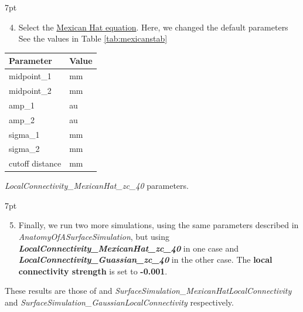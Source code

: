 \documentclass{tufte-handout}
\newenvironment{formal}{%
  \def\FrameCommand{%
    \hspace{1pt}%
    {\color{DarkBlue}\vrule width 2pt}%
    {\color{formalshade}\vrule width 4pt}%
    \colorbox{formalshade}%
  }%
  \MakeFramed{\advance\hsize-\width\FrameRestore}%
  \noindent\hspace{-4.55pt}%
  \begin{adjustwidth}{}{7pt}%
  \vspace{2pt}\vspace{2pt}%
}
{%
  \vspace{2pt}\end{adjustwidth}\endMakeFramed%
}
\newenvironment{simulation}{%
  \def\FrameCommand{%
    \hspace{1pt}%
    {\color{ForestGreen}\vrule width 2pt}%
    {\color{simulationshade}\vrule width 4pt}%
    \colorbox{simulationshade}%
  }%
  \MakeFramed{\advance\hsize-\width\FrameRestore}%
  \noindent\hspace{-4.55pt}%
  \begin{adjustwidth}{}{7pt}%
  \vspace{2pt}\vspace{2pt}%
}
{%
  \vspace{2pt}\end{adjustwidth}\endMakeFramed%
}
\begin{document}
\begin{formal}
\begin{enumerate}[resume]
\setcounter{enumi}{3}
\item Select the \underline{Mexican Hat equation}. Here, we changed the default parameters See the values in Table \ref{tab:mexicanstab}
\end{enumerate}
\end{formal}

\begin{margintable}
  \centering
  \selectfont
  \begin{tabular}{ll}
    \toprule
    Parameter & Value \\
    \midrule
             midpoint\_1          &   \unit[0]{mm}\\
             midpoint\_2          &   \unit[0]{mm}   \\
             amp\_1                 &   \unit[2]{au}        \\
             amp\_2                 &   \unit[1]{au}        \\
             sigma\_1          &   \unit[5]{mm}   \\
             sigma\_2          &   \unit[15]{mm}   \\
             cutoff distance & \unit[40]{mm}\\
    \bottomrule
  \end{tabular}
  \caption{\textit{LocalConnectivity\_MexicanHat\_zc\_40} parameters. }
  \label{tab:mexicanstab}
\end{margintable}

\begin{simulation}
\begin{enumerate}[resume]
\setcounter{enumi}{4}
\item Finally, we run two  more simulations, using the same parameters described in \textit{AnatomyOfASurfaceSimulation}, but using  \textbf{\textit{LocalConnectivity\_MexicanHat\_zc\_40}} in one case and  \textbf{\textit{LocalConnectivity\_Guassian\_zc\_40}} in the other case. The \textbf{local connectivity strength} is set to \textbf{-0.001}. 

\end{enumerate}
\end{simulation}

These results are those of and \textit{SurfaceSimulation\_MexicanHatLocalConnectivity} and \textit{SurfaceSimulation\_GaussianLocalConnectivity} respectively.
 
\end{document}
